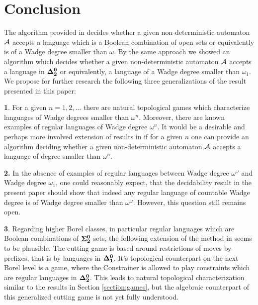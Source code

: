 
\section{Conclusion}
The algorithm provided in \cite{bp} decides whether a given non-deterministic automaton ${\mathcal A}$ accepts a language which is a Boolean combination of open sets or equivalently is of a  Wadge degree smaller than $\omega$. 
By the same approach we showed an algorithm which decides whether a given non-deterministic automaton ${\mathcal A}$ accepts a language in ${\bf \Delta^0_2}$ or equivalently, a language of a Wadge degree smaller than $\omega_1$. 
We propose for further research the following three generalizations of the result presented in this paper:

\noindent
{\bf 1}. %
For a given $n=1,2,\dots$ there are natural topological games which characterize languages of Wadge degrees smaller than $\omega^n$. Moreover, there are known examples of regular languages of Wadge degree $\omega^n$. It would be a desirable and perhaps more involved extension of results in \cite{bp} if for a given $n$ one can provide an algorithm deciding whether a given non-deterministic automaton ${\mathcal A}$ accepts a language of degree smaller than $\omega^n$. 

\noindent
{\bf 2.} In the absence of examples of regular languages between Wadge degree $\omega^\omega$ and Wadge degree $\omega_1$, one could reasonably expect, that the decidability result in the present paper should show that indeed any regular language of countable Wadge degree is of Wadge degree smaller than $\omega^\omega$. However, this question still remains open.  

\noindent
{\bf 3}. Regarding higher Borel classes, in particular regular languages which are Boolean combinations of ${\bf \Sigma^0_2}$ sets, the following extension of the method in \cite{bp} seems to be plausible. The cutting game is based around restrictions of moves by prefixes, that is 
by languages in ${\bf \Delta^0_1}$. It's  topological counterpart on the next Borel level is a game, where the Constrainer is allowed to play constraints which are regular languages in ${\bf \Delta^0_2}$. This leads to natural topological characterization similar to the results in Section \ref{section:games}, but the algebraic counterpart of this generalized cutting game is not yet fully understood.
